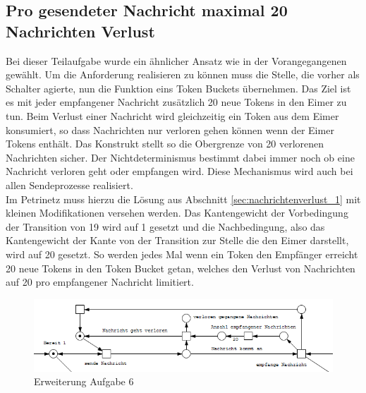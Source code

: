 \documentclass[10pt]{scrartcl}
\begin{document}
\subsection{Pro gesendeter Nachricht maximal 20 Nachrichten Verlust}
Bei dieser Teilaufgabe wurde ein ähnlicher Ansatz wie in der Vorangegangenen gewählt.
Um die Anforderung realisieren zu können muss die Stelle, die vorher als Schalter agierte, nun die Funktion eins Token Buckets übernehmen.
Das Ziel ist es mit jeder empfangener Nachricht zusätzlich 20 neue Tokens in den Eimer zu tun.
Beim Verlust einer Nachricht wird gleichzeitig ein Token aus dem Eimer konsumiert, so dass Nachrichten nur verloren gehen können wenn der Eimer Tokens enthält.
Das Konstrukt stellt so die Obergrenze von 20 verlorenen Nachrichten sicher.
Der Nichtdeterminismus bestimmt dabei immer noch ob eine Nachricht verloren geht oder empfangen wird.
Diese Mechanismus wird auch bei allen Sendeprozesse realisiert.\\
Im Petrinetz muss hierzu die Lösung aus Abschnitt \ref{sec:nachrichtenverlust_1} mit kleinen Modifikationen versehen werden.
Das Kantengewicht der Vorbedingung der Transition von 19 wird auf 1 gesetzt und die Nachbedingung, also das Kantengewicht der Kante von der Transition zur Stelle die den Eimer darstellt, wird auf 20 gesetzt.
So werden jedes Mal wenn ein Token den Empfänger erreicht 20 neue Tokens in den Token Bucket getan, welches den Verlust von Nachrichten auf 20 pro empfangener Nachricht limitiert. 
 
\begin{figure}[htbp]
	\centering	\includegraphics[width=1.0\textwidth]{Bilder/Erweiterung_Aufgabe_6}
	\caption{Erweiterung Aufgabe 6}
	\label{fig:Erweiterung6}
\end{figure}
\end{document}
